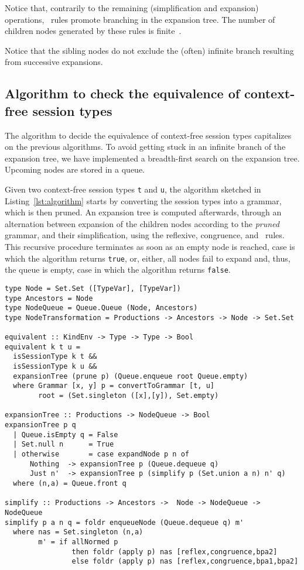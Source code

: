 Notice that, contrarily to the remaining (simplification and expansion) operations, 
\BPA\ rules promote branching in the expansion tree. The number of children nodes 
generated by these rules is finite~\cite{DBLP:journals/iandc/ChristensenHS95}.

Notice that the sibling nodes do not exclude the (often) infinite branch 
resulting from successive expansions.

\subsection{Algorithm to check the equivalence of context-free session types}

The algorithm to decide the equivalence of context-free session 
types capitalizes on the previous algorithms. To avoid getting stuck in an 
infinite branch of the expansion tree, we have implemented 
a breadth-first search on the expansion tree. Upcoming nodes are stored
in a queue.

Given two context-free session types \lstinline|t| and \lstinline|u|,
the algorithm sketched in Listing~\ref{lst:algorithm} starts by converting 
the session types into a grammar, which is then pruned. An expansion tree is
computed afterwards, through an alternation between expansion of the children
nodes according to the \emph{pruned} grammar, and their simplification, 
using the reflexive, congruence, and \BPA\ rules. This recursive procedure
terminates as soon as an empty node is reached, case is which the
algorithm returns \lstinline|true|, or, either, all nodes fail to expand
and, thus, the queue is empty, case in which the algorithm returns
\lstinline|false|. 

\begin{lstlisting}[caption={Algorithm to check the equivalence of context-free session types. Haskell code.},label={lst:algorithm},captionpos=b]
type Node = Set.Set ([TypeVar], [TypeVar])
type Ancestors = Node
type NodeQueue = Queue.Queue (Node, Ancestors)
type NodeTransformation = Productions -> Ancestors -> Node -> Set.Set 

equivalent :: KindEnv -> Type -> Type -> Bool
equivalent k t u =
  isSessionType k t &&
  isSessionType k u &&
  expansionTree (prune p) (Queue.enqueue root Queue.empty)
  where Grammar [x, y] p = convertToGrammar [t, u]
        root = (Set.singleton ([x],[y]), Set.empty)

expansionTree :: Productions -> NodeQueue -> Bool
expansionTree p q
  | Queue.isEmpty q = False
  | Set.null n      = True
  | otherwise       = case expandNode p n of
      Nothing  -> expansionTree p (Queue.dequeue q)
      Just n'  -> expansionTree p (simplify p (Set.union a n) n' q)
  where (n,a) = Queue.front q

simplify :: Productions -> Ancestors ->  Node -> NodeQueue -> NodeQueue
simplify p a n q = foldr enqueueNode (Queue.dequeue q) m'
  where nas = Set.singleton (n,a)
        m' = if allNormed p 
                then foldr (apply p) nas [reflex,congruence,bpa2]
                else foldr (apply p) nas [reflex,congruence,bpa1,bpa2]
\end{lstlisting}


